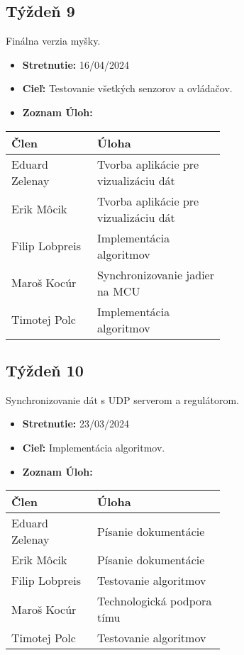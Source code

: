 \subsection{Týždeň 9}
Finálna verzia myšky.
\begin{itemize}
    \item \textbf{Stretnutie:} 16/04/2024
    \item \textbf{Cieľ: } Testovanie všetkých senzorov a ovládačov.
    \item \textbf{Zoznam Úloh:}
\end{itemize}

\begin{table}[H]
    \centering
    \begin{tabular}{|l|p{0.6\linewidth}|}
        \hline
        \textbf{Člen} & \textbf{Úloha} \\
        \hline
        Eduard Zelenay & Tvorba aplikácie pre vizualizáciu dát \\
        \hline
        Erik Môcik & Tvorba aplikácie pre vizualizáciu dát \\
        \hline
        Filip Lobpreis & Implementácia algoritmov \\
        \hline
        Maroš Kocúr & Synchronizovanie jadier na MCU \\
        \hline
        Timotej Polc & Implementácia algoritmov \\
        \hline
    \end{tabular}
\end{table}

\subsection{Týždeň 10}
Synchronizovanie dát s UDP serverom a regulátorom.
\begin{itemize}
    \item \textbf{Stretnutie:} 23/03/2024
    \item \textbf{Cieľ: } Implementácia algoritmov.
    \item \textbf{Zoznam Úloh:}
\end{itemize}

\begin{table}[H]
    \centering
    \begin{tabular}{|l|p{0.6\linewidth}|}
        \hline
        \textbf{Člen} & \textbf{Úloha} \\
        \hline
        Eduard Zelenay & Písanie dokumentácie \\
        \hline
        Erik Môcik & Písanie dokumentácie \\
        \hline
        Filip Lobpreis & Testovanie algoritmov \\
        \hline
        Maroš Kocúr & Technologická podpora tímu \\
        \hline
        Timotej Polc & Testovanie algoritmov \\
        \hline
    \end{tabular}
\end{table}
\newpage
